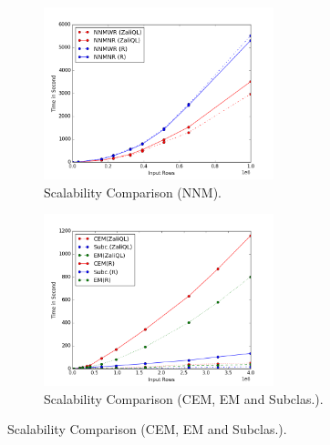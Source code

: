 \begin{figure}
\hspace*{-0.7cm}\begin{subfigure}{0.59\linewidth}
\centering
\includegraphics[height=5cm,width=1.02\linewidth]{Figures/NNM.png}
\caption{{Scalability Comparison (NNM).}}
\label{sfig:testaa}
\end{subfigure}\hfill
 \hspace*{-0.45cm}\begin{subfigure}{0.59\linewidth}
\centering
\vspace*{0.41cm} \includegraphics[height=5cm,width=1.02\linewidth]{Figures/exact.png}
\caption{{Scalability Comparison (CEM, EM and Subclas.).}}
\label{sfig:testbb}
\end{subfigure}\hfill


\end{figure}
